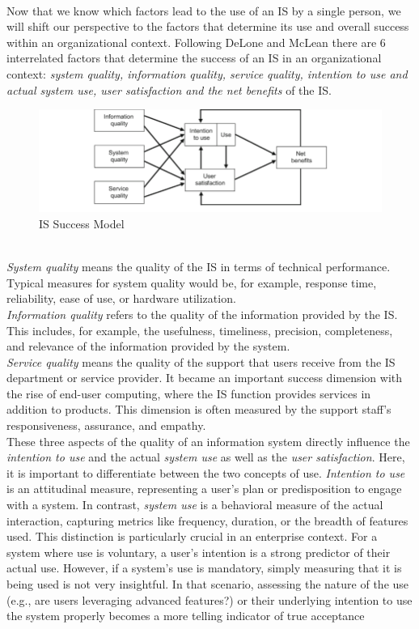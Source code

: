 \documentclass[
	english,
	ruledheaders=section,%
	class=report,%
	thesis={type=bachelor},%
	accentcolor=1b,%
	custommargins=true,%
	marginpar=false,%
	parskip=half-,%
	fontsize=11pt,%
	DIV=14,
]{tudapub}
\begin{document}
\\
Now that we know which factors lead to the use of an IS by a single person, we will shift our perspective to the factors that determine its use and overall success within an organizational context.
Following DeLone and McLean \parencite{DeloneMcLean2003ISSuccessTenYearUpdate} there are 6 interrelated factors that determine the success of an IS in an organizational context: \textit{system quality, information quality, service quality, intention to use and actual system use, user satisfaction and the net benefits} of the IS.\\
\begin{figure}[h!]
    \includegraphics[width=1\linewidth]{images/ISSuccess.png}
    \caption{IS Success Model}
    \label{fig:enter-label}
\end{figure}
\\
\textit{System quality} means the quality of the IS in terms of technical performance. Typical measures for system quality would be, for example, response time, reliability, ease of use, or hardware utilization.\\
\textit{Information quality} refers to the quality of the information provided by the IS. This includes, for example, the usefulness, timeliness, precision, completeness, and relevance of the information provided by the system.\\
\textit{Service quality} means the quality of the support that users receive from the IS department or service provider. It became an important success dimension with the rise of end-user computing, where the IS function provides services in addition to products. This dimension is often measured by the support staff's responsiveness, assurance, and empathy.
\\
These three aspects of the quality of an information system directly influence the \textit{intention to use} and the actual \textit{system use} as well as the \textit{user satisfaction}. Here, it is important to differentiate between the two concepts of use. \textit{Intention to use} is an attitudinal measure, representing a user's plan or predisposition to engage with a system. In contrast, \textit{system use} is a behavioral measure of the actual interaction, capturing metrics like frequency, duration, or the breadth of features used. This distinction is particularly crucial in an enterprise context. For a system where use is voluntary, a user's intention is a strong predictor of their actual use. However, if a system's use is mandatory, simply measuring that it is being used is not very insightful. In that scenario, assessing the nature of the use (e.g., are users leveraging advanced features?) or their underlying intention to use the system properly becomes a more telling indicator of true acceptance 
\end{document}
